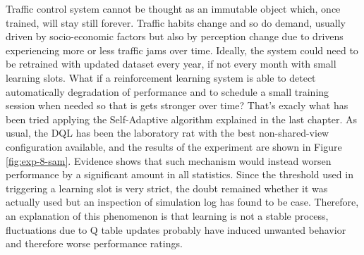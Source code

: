 Traffic control system cannot be thought as an immutable object which, once trained, will stay still forever.
Traffic habits change and so do demand, usually driven by socio-economic factors but also by perception change due to drivens experiencing more or less traffic jams over time.
Ideally, the system could need to be retrained with updated dataset every year, if not every month with small learning slots.
What if a reinforcement learning system is able to detect automatically degradation of performance and to schedule a small training session when needed so that is gets stronger over time?
That's exacly what has been tried applying the Self-Adaptive algorithm explained in the last chapter.
As usual, the DQL has been the laboratory rat with the best non-shared-view configuration available, and the results of the experiment are shown in Figure \ref{fig:exp-8-sam}.
Evidence shows that such mechanism would instead worsen performance by a significant amount in all statistics.
Since the threshold used in triggering a learning slot is very strict, the doubt remained whether it was actually used but an inspection of simulation log has found to be case.
Therefore, an explanation of this phenomenon is that learning is not a stable process, fluctuations due to Q table updates probably have induced unwanted behavior and therefore worse performance ratings.

